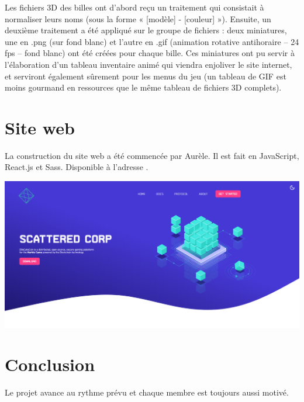 \documentclass{article}
\begin{document}
Les fichiers 3D des billes ont d’abord reçu un traitement qui consistait à normaliser leurs noms (sous la forme « [modèle] - [couleur] »).
Ensuite, un deuxième traitement a été appliqué sur le groupe de fichiers : deux miniatures, une en .png (sur fond blanc) et l’autre en .gif (animation rotative antihoraire – 24 fps – fond blanc) ont été créées pour chaque bille.
Ces miniatures ont pu servir à l’élaboration d’un tableau inventaire animé qui viendra enjoliver le site internet, et serviront également sûrement pour les menus du jeu (un tableau de GIF est moins gourmand en ressources que le même tableau de fichiers 3D complets).


\section{Site web}
La construction du site web a été commencée par Aurèle. Il est fait en JavaScript, React.js et Sass.
Disponible à l'adresse .\\[1ex]
\begin{center}
\includegraphics[width=0.8\linewidth]{report/website.png}\\
\end{center}

\section{Conclusion}
Le projet avance au rythme prévu et chaque membre est toujours aussi motivé.
\end{document}

